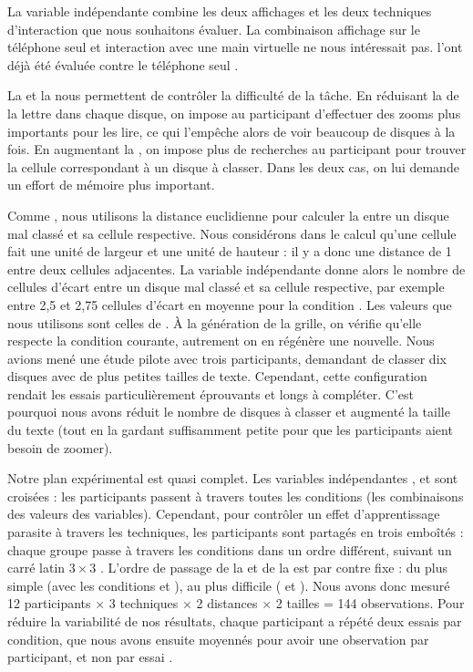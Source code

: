 La variable indépendante  combine les deux affichages et les deux techniques d'interaction que nous souhaitons évaluer. La combinaison affichage sur le téléphone seul et interaction avec une main virtuelle ne nous intéressait pas. \cite{Jones2012} l'ont déjà été évaluée contre le téléphone seul .

La  et la  nous permettent de contrôler la difficulté de la tâche. En réduisant la  de la lettre dans chaque disque, on impose au participant d'effectuer des zooms plus importants pour les lire, ce qui l'empêche alors de voir beaucoup de disques à la fois. En augmentant la , on impose plus de recherches au participant pour trouver la cellule correspondant à un disque à classer. Dans les deux cas, on lui demande un effort de mémoire plus important.

Comme \citeauthor{Liu2014}, nous utilisons la distance euclidienne pour calculer la  entre un disque mal classé et sa cellule respective. Nous considérons dans le calcul qu'une cellule fait une unité de largeur et une unité de hauteur : il y a donc une distance de 1 entre deux cellules adjacentes. La variable indépendante donne alors le nombre de cellules d'écart entre un disque mal classé et sa cellule respective, par exemple entre 2,5 et 2,75 cellules d'écart en moyenne pour la condition . Les valeurs que nous utilisons sont celles de \cite{Liu2014}. À la génération de la grille, on vérifie qu'elle respecte la condition courante, autrement on en régénère une nouvelle. Nous avions mené une étude pilote avec trois participants, demandant de classer dix disques avec de plus petites tailles de texte. Cependant, cette configuration rendait les essais particulièrement éprouvants et longs à compléter. C'est pourquoi nous avons réduit le nombre de disques à classer et augmenté la taille du texte (tout en la gardant suffisamment petite pour que les participants aient besoin de zoomer).

Notre plan expérimental est quasi complet. Les variables indépendantes ,  et  sont croisées : les participants passent à travers toutes les conditions (les combinaisons des valeurs des variables). Cependant, pour contrôler un effet d'apprentissage parasite à travers les techniques, les participants sont partagés en trois  emboîtés : chaque groupe passe à travers les conditions  dans un ordre différent, suivant un carré latin $3 \times 3$ . L'ordre de passage de la  et de la  est par contre fixe : du plus simple (avec les conditions  et ), au plus difficile ( et ). Nous avons donc mesuré 12 participants $\times$ 3 techniques $\times$ 2 distances $\times$ 2 tailles = 144 observations. Pour réduire la variabilité de nos résultats, chaque participant a répété deux essais par condition, que nous avons ensuite moyennés pour avoir une observation par participant, et non par essai \citep[p. 24]{Dragicevic2016}.

